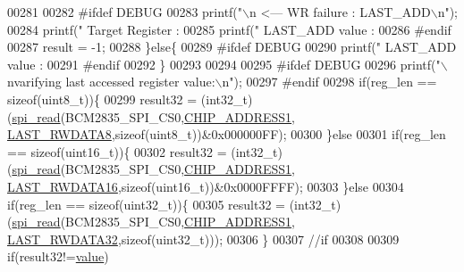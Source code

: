 \begin{DoxyCode}
{{{{{00281              
00282 \textcolor{preprocessor}{     #ifdef DEBUG}
00283 \textcolor{preprocessor}{}       printf(\textcolor{stringliteral}{"\(\backslash\)n                                               <---  WR failure : LAST\_ADD\(\backslash\)n"});
00284        printf(\textcolor{stringliteral}{"        Target Register :%
00285        printf(\textcolor{stringliteral}{"        LAST\_ADD value  :%
00286 \textcolor{preprocessor}{     #endif}
00287 \textcolor{preprocessor}{}     result = -1;
00288      \}\textcolor{keywordflow}{else}\{
00289 \textcolor{preprocessor}{      #ifdef DEBUG}
00290 \textcolor{preprocessor}{}        printf(\textcolor{stringliteral}{"       LAST\_ADD value  :%
00291 \textcolor{preprocessor}{      #endif}
00292 \textcolor{preprocessor}{}     \}
00293      
00294     
00295 \textcolor{preprocessor}{     #ifdef DEBUG}
00296 \textcolor{preprocessor}{}       printf(\textcolor{stringliteral}{"\(\backslash\)nvarifying last accessed register  value:\(\backslash\)n"});
00297 \textcolor{preprocessor}{     #endif}
00298 \textcolor{preprocessor}{}    \textcolor{keywordflow}{if}(reg\_len == \textcolor{keyword}{sizeof}(uint8\_t))\{
00299         result32 = (int32\_t)(\hyperlink{a00007_ga7ad9f65ee46aca507374096506a0b1c4}{spi\_read}(BCM2835\_SPI\_CS0,\hyperlink{a00037_a94de2b046db6e10257ef4481c0a15eaa}{CHIP\_ADDRESS1},
      \hyperlink{a00036_ac23cb2354e07d7403fca849805a8e278}{LAST\_RWDATA8},\textcolor{keyword}{sizeof}(uint8\_t))&0x000000FF);
00300     \}\textcolor{keywordflow}{else}   
00301     \textcolor{keywordflow}{if}(reg\_len == \textcolor{keyword}{sizeof}(uint16\_t))\{
00302         result32 = (int32\_t)(\hyperlink{a00007_ga7ad9f65ee46aca507374096506a0b1c4}{spi\_read}(BCM2835\_SPI\_CS0,\hyperlink{a00037_a94de2b046db6e10257ef4481c0a15eaa}{CHIP\_ADDRESS1},
      \hyperlink{a00036_afcefca411effe86930341732382fb5e5}{LAST\_RWDATA16},\textcolor{keyword}{sizeof}(uint16\_t))&0x0000FFFF);
00303     \}\textcolor{keywordflow}{else}
00304     \textcolor{keywordflow}{if}(reg\_len == \textcolor{keyword}{sizeof}(uint32\_t))\{
00305         result32 = (int32\_t)(\hyperlink{a00007_ga7ad9f65ee46aca507374096506a0b1c4}{spi\_read}(BCM2835\_SPI\_CS0,\hyperlink{a00037_a94de2b046db6e10257ef4481c0a15eaa}{CHIP\_ADDRESS1},
      \hyperlink{a00036_a0d09934e23666ce21357121f281f2f2a}{LAST\_RWDATA32},\textcolor{keyword}{sizeof}(uint32\_t)));      
00306     \}   
00307     \textcolor{comment}{//if }
00308 
00309      \textcolor{keywordflow}{if}(result32!=\hyperlink{a00041_a638e4503e0ae6ce655b7ad2e17e8f0ad}{value})
}}}}}}}}
\end{DoxyCode}
